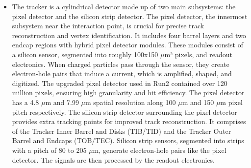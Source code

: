 \begin{itemize}
\item The tracker is a cylindrical detector made up of two main subsystems: the pixel detector and the silicon strip detector. The pixel detector, the innermost subsystem near the interaction point, is crucial for precise track reconstruction and vertex identification. It includes four barrel layers and two endcap regions with hybrid pixel detector modules. These modules consist of a silicon sensor, segmented into roughly 100x150 $\mu$m² pixels, and readout electronics. When charged particles pass through the sensor, they create electron-hole pairs that induce a current, which is amplified, shaped, and digitized. The upgraded pixel detector used in Run2 contained over 120 million pixels, ensuring high granularity and hit efficiency. The pixel detector has a 4.8 $\mu$m  and 7.99 $\mu$m  spatial resolution along 100 $\mu$m and 150 $\mu$m pixel pitch respectively. The silicon strip detector surrounding the pixel detector provides extra tracking points for improved track reconstruction. It comprises of the Tracker Inner Barrel and Disks (TIB/TID) and the Tracker Outer Barrel and Endcaps (TOB/TEC). Silicon strip sensors, segmented into strips with a pitch of 80 to 205 $\mu$m, generate electron-hole pairs like the pixel detector. The signals are then processed by the readout electronics.


\end{itemize}
